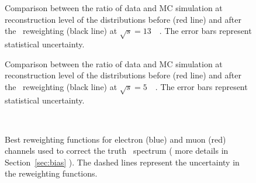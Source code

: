 \begin{figure}[h]
\centering
{}

\caption{Comparison between the ratio of data and MC simulation at reconstruction level of the \ut distributions before (red line) and after the \pt\ reweighting (black line) at $\sqrt{s} = 13$~\TeV\ . The error bars represent statistical uncertainty. }
\label{fig:datamc_MCreweighting_uT13TeV}
\end{figure}

\begin{figure}[h]
\centering
{}

\caption{Comparison between the ratio of data and MC simulation at reconstruction level of the \ut distributions before (red line) and after the \pt\ reweighting (black line) at $\sqrt{s} = 5$~\TeV\ . The error bars represent statistical uncertainty. }
\label{fig:datamc_MCreweighting_uT5TeV}
\end{figure}


\begin{figure}[h]
\centering
{}
\\
\caption{Best reweighting functions for electron (blue) and muon (red) channels used to correct the truth \ptz\ spectrum ( more details in Section~\ref{sec:bias} ). The dashed lines represent the uncertainty in the reweighting functions.}
\label{fig:rew_sf_zpt}
\end{figure}

